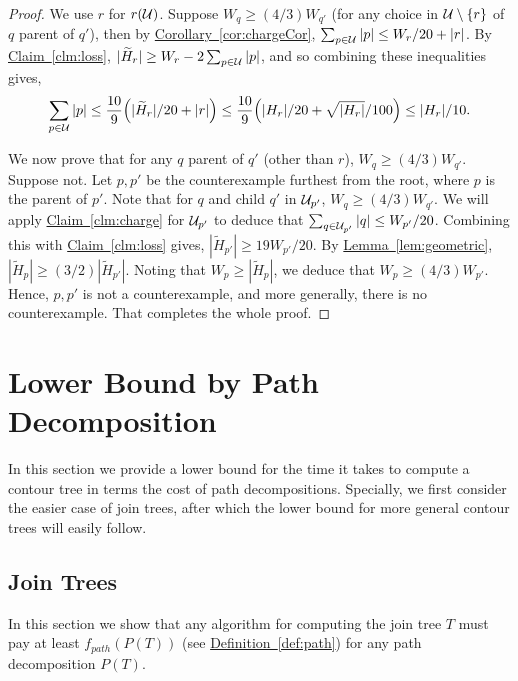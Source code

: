\documentclass[11pt]{article}
\theoremstyle{definition}
\newcommand{\cU}{{\cal U}}
\newcommand{\Clm}[1]{\hyperref[clm:#1]{Claim~\ref*{clm:#1}}} %
\newcommand{\Lem}[1]{\hyperref[lem:#1]{Lemma~\ref*{lem:#1}}} %
\newcommand{\Cor}[1]{\hyperref[cor:#1]{Corollary~\ref*{cor:#1}}} %
\newcommand{\Def}[1]{\hyperref[def:#1]{Definition~\ref*{def:#1}}} %
\newcommand{\redH}{\widetilde{H}}
\newcommand{\pth}[2][\!]{#1\left({#2}\right)}
\begin{document}
\begin{proof} We use $r$ for $r(\cU)$. %
Suppose $W_q \geq (4/3)W_{q'}$ (for any choice in $\cU\setminus\{r\}$ of $q$ parent of $q'$), 
then by \Cor{chargeCor}, $\sum_{p \in \cU} |p| \leq W_{r}/20+|r|$.
By \Clm{loss}, $|\redH_r| \geq W_r - 2\sum_{p \in \cU} |p|$, and so combining these inequalities gives,
\[
 \sum_{p \in \cU} |p|\leq \frac{10}{9} \pth{|\redH_r|/20+|r|} \leq 
 \frac{10}{9}\pth{|H_r|/20+\sqrt{|H_r|}/100} \leq |H_r|/10.
\]

We now prove that for any $q$ parent of $q'$ (other than $r$), $W_q \geq (4/3)W_{q'}$.
Suppose not. Let $p, p'$ be the counterexample furthest from the root,
where $p$ is the parent of $p'$. 
Note that for $q$ and child $q'$ in $\cU_{p'}$, $W_q \geq (4/3)W_{q'}$.
We will apply \Clm{charge} for $\cU_{p'}$ to deduce that $\sum_{q \in \cU_{p'}} |q| \leq W_{p'}/20$.
Combining this with \Clm{loss} gives, $|\redH_{p'}| \geq 19W_{p'}/20$. By \Lem{geometric}, $|\redH_p| \geq (3/2)|\redH_{p'}|$.
Noting that $W_p \geq |\redH_p|$, we deduce that $W_p \geq (4/3)W_{p'}$.
Hence, $p, p'$ is not a counterexample, and more generally, there is no counterexample.
That completes the whole proof.
\end{proof}







\section{Lower Bound by Path Decomposition}
In this section we provide a lower bound for the time it takes to compute a contour tree in terms the cost of path decompositions.  Specially, 
we first consider the easier case of join trees, after which the lower bound for more general contour trees will easily follow.

\subsection{Join Trees}
In this section we show that any algorithm for computing the join tree $T$ must pay at least $f_{path}(P(T))$ (see \Def{path}) for any path decomposition $P(T)$.

\end{document}
